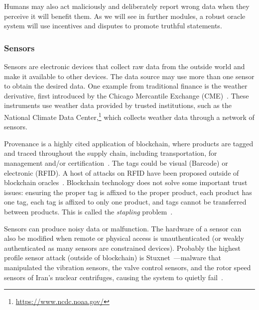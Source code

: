 Humans may also act maliciously and deliberately report wrong data when they perceive it will benefit them. As we will see in further modules, a robust oracle system will use incentives and disputes to promote truthful statements. 





\subsubsection{Sensors} Sensors are electronic devices that collect raw data from the outside world and make it available to other devices. The data source may use more than one sensor to obtain the desired data. One example from traditional finance is the weather derivative, first introduced by the Chicago Mercantile Exchange (CME)~\cite{muller2000weather}. These instruments use weather data provided by trusted institutions, such as the National Climate Data Center,\footnote{\url{https://www.ncdc.noaa.gov/}} which collects weather data through a network of sensors.

Provenance is a highly cited application of blockchain, where products are tagged and traced throughout the supply chain, including transportation, for management and/or certification~\cite{tian2016agri,mondal2019blockchain,zelbst2019impact}. The tags could be visual (Barcode) or electronic (RFID). A host of attacks on RFID have been proposed outside of blockchain oracles~\cite{alizadeh2012survey}. Blockchain technology does not solve some important trust issues: ensuring the proper tag is affixed to the proper product, each product has one tag, each tag is affixed to only one product, and tags cannot be transferred between products. This is called the \textit{stapling} problem~\cite{RKYCC20}. 

Sensors can produce noisy data or malfunction. The hardware of a sensor can also be modified when remote or physical access is unauthenticated (or weakly authenticated as many sensors are constrained devices). Probably the highest profile sensor attack (outside of blockchain) is Stuxnet~\cite{langner2011stuxnet}---malware that manipulated the vibration sensors, the valve control sensors, and the rotor speed sensors of Iran's nuclear centrifuges, causing the system to quietly fail~\cite{stuxnetattack}.

